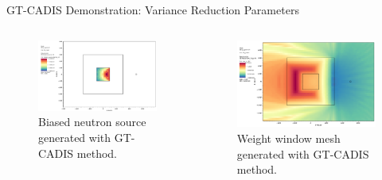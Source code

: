 \documentclass{beamer}
\begin{document}
\begin{frame}{GT-CADIS Demonstration: Variance Reduction Parameters}
	\begin{columns}
\begin{figure} 
	\includegraphics[scale=0.17]{biased_n_src.png}
	\caption [GT-CADIS biased neutron source] 
	{Biased neutron source generated with GT-CADIS method.\label{fig:ex.biased_src}}
\end{figure}


\begin{figure} 
	\includegraphics[scale=0.15]{gtcadis_wwn.png}
	\caption [GT-CADIS weight window mesh]
	{Weight window mesh generated with GT-CADIS method.\label{fig:ex.wwinp}}
\end{figure}

	\end{columns}
\end{frame}
\end{document}
